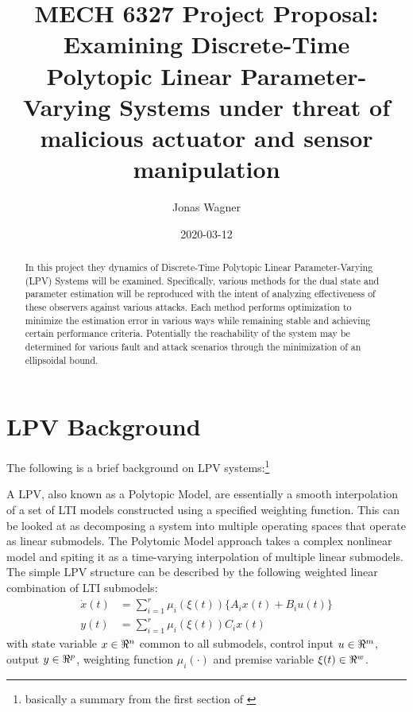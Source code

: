 \documentclass[]{article}
\title{MECH 6327 Project Proposal:\\
Examining Discrete-Time Polytopic Linear Parameter-Varying Systems under threat of malicious actuator and sensor manipulation}
\author{Jonas Wagner}
\date{2020-03-12}
\begin{document}
\maketitle

\begin{abstract}
	In this project they dynamics of Discrete-Time Polytopic Linear Parameter-Varying (LPV) Systems will be examined. Specifically, various methods for the dual state and parameter estimation will be reproduced with the intent of analyzing effectiveness of these observers against various attacks. Each method performs optimization to minimize the estimation error in various ways while remaining stable and achieving certain performance criteria. Potentially the reachability of the system may be determined for various fault and attack scenarios through the minimization of an ellipsoidal bound.
\end{abstract}

\section{LPV Background}
The following is a brief background on LPV systems:\footnote{basically a summary from the first section of \cite{ORJUELA2019295}}

A LPV, also known as a Polytopic Model, are essentially a smooth interpolation of a set of LTI models constructed using a specified weighting function. This can be looked at as decomposing a system into multiple operating spaces that operate as linear submodels. The Polytomic Model approach takes a complex nonlinear model and spiting it as a time-varying interpolation of multiple linear submodels.\cite{ORJUELA2019295}\\

The simple LPV structure can be described by the following weighted linear combination of LTI submodels:
\begin{equation}\label{eq:LPV_sys_def}
	\begin{aligned}
		\dot{x}(t) 	&= \sum_{i=1}^r \mu_i(\xi(t))\{A_i x(t) + B_i u(t)\}\\
		y(t)		&= \sum_{i=1}^r \mu_i(\xi(t)) C_i x(t)
	\end{aligned}
\end{equation}
with state variable $x \in \real^n$ common to all submodels, control input $u \in \real^m$, output $y \in \real^p$, weighting function $\mu_i(\cdot)$ and premise variable $\xi(t) \in \real^{w}$. \cite{ORJUELA2019295} \cite{orjuela2013nonlinear}
\end{document}
